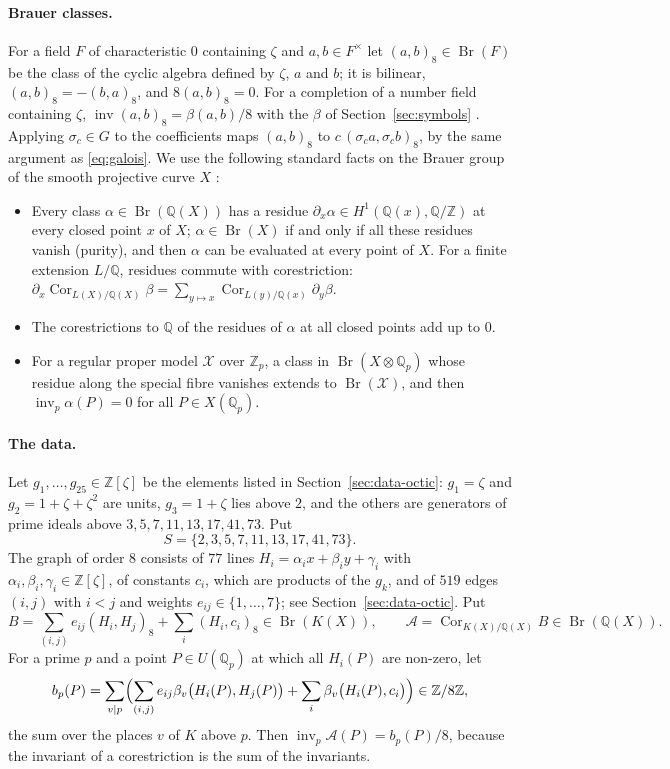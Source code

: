 \documentclass[11pt]{article}
\newcommand{\Z}{\mathbb{Z}}
\newcommand{\Q}{\mathbb{Q}}
\newcommand{\Br}{\operatorname{Br}}
\newcommand{\Cor}{\operatorname{Cor}}
\newcommand{\inv}{\operatorname{inv}}
\begin{document}
\paragraph{Brauer classes.} For a field $F$ of characteristic $0$ containing $\zeta$ and $a,b\in F^\times$ let $(a,b)_8\in\Br(F)$ be the class of the cyclic algebra defined by $\zeta$, $a$ and $b$; it is bilinear, $(a,b)_8=-(b,a)_8$, and $8(a,b)_8=0$. For a completion of a number field containing $\zeta$, $\inv(a,b)_8=\beta(a,b)/8$ with the $\beta$ of Section~\ref{sec:symbols} \cite[Chapter~V, \S3]{N}. Applying $\sigma_c\in G$ to the coefficients maps $(a,b)_8$ to $c\,(\sigma_ca,\sigma_cb)_8$, by the same argument as \eqref{eq:galois}. We use the following standard facts on the Brauer group of the smooth projective curve $X$ \cite{P}:
\begin{itemize}
\item[(B1)] Every class $\alpha\in\Br(\Q(X))$ has a residue $\partial_x\alpha\in H^1(\Q(x),\Q/\Z)$ at every closed point $x$ of $X$; $\alpha\in\Br(X)$ if and only if all these residues vanish (purity), and then $\alpha$ can be evaluated at every point of $X$. For a finite extension $L/\Q$, residues commute with corestriction: $\partial_x\Cor_{L(X)/\Q(X)}\beta=\sum_{y\mapsto x}\Cor_{L(y)/\Q(x)}\partial_y\beta$.
\item[(B2)] The corestrictions to $\Q$ of the residues of $\alpha$ at all closed points add up to $0$.
\item[(B3)] For a regular proper model $\mathcal X$ over $\Z_p$, a class in $\Br(X\otimes\Q_p)$ whose residue along the special fibre vanishes extends to $\Br(\mathcal X)$, and then $\inv_p\alpha(P)=0$ for all $P\in X(\Q_p)$.
\end{itemize}

\paragraph{The data.} Let $g_1,\dots,g_{25}\in\Z[\zeta]$ be the elements listed in Section~\ref{sec:data-octic}: $g_1=\zeta$ and $g_2=1+\zeta+\zeta^2$ are units, $g_3=1+\zeta$ lies above $2$, and the others are generators of prime ideals above $3,5,7,11,13,17,41,73$. Put
\[
S=\{2,3,5,7,11,13,17,41,73\}.
\]
The graph of order $8$ consists of $77$ lines $H_i=\alpha_ix+\beta_iy+\gamma_i$ with $\alpha_i,\beta_i,\gamma_i\in\Z[\zeta]$, of constants $c_i$, which are products of the $g_k$, and of $519$ edges $(i,j)$ with $i<j$ and weights $e_{ij}\in\{1,\dots,7\}$; see Section~\ref{sec:data-octic}. Put
\[
B=\sum_{(i,j)}e_{ij}(H_i,H_j)_8+\sum_i(H_i,c_i)_8\in\Br(K(X)),\qquad \mathcal A=\Cor_{K(X)/\Q(X)}B\in\Br(\Q(X)).
\]
For a prime $p$ and a point $P\in U(\Q_p)$ at which all $H_i(P)$ are non-zero, let
\begin{equation}\label{eq:bp}
b_p(P)=\sum_{v\mid p}\Bigl(\sum_{(i,j)}e_{ij}\beta_v\bigl(H_i(P),H_j(P)\bigr)+\sum_i\beta_v\bigl(H_i(P),c_i\bigr)\Bigr)\in\Z/8\Z,
\end{equation}
the sum over the places $v$ of $K$ above $p$. Then $\inv_p\mathcal A(P)=b_p(P)/8$, because the invariant of a corestriction is the sum of the invariants.
\end{document}
